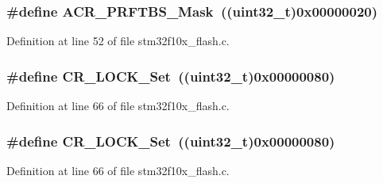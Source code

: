 \subsubsection[{\texorpdfstring{A\+C\+R\+\_\+\+P\+R\+F\+T\+B\+S\+\_\+\+Mask}{ACR_PRFTBS_Mask}}]{\setlength{\rightskip}{0pt plus 5cm}\#define A\+C\+R\+\_\+\+P\+R\+F\+T\+B\+S\+\_\+\+Mask~(({\bf uint32\+\_\+t})0x00000020)}\hypertarget{group___f_l_a_s_h___private___defines_ga257768fe5d61ac49f43b6b90ba413102}{}\label{group___f_l_a_s_h___private___defines_ga257768fe5d61ac49f43b6b90ba413102}


Definition at line 52 of file stm32f10x\+\_\+flash.\+c.

\subsubsection[{\texorpdfstring{C\+R\+\_\+\+L\+O\+C\+K\+\_\+\+Set}{CR_LOCK_Set}}]{\setlength{\rightskip}{0pt plus 5cm}\#define C\+R\+\_\+\+L\+O\+C\+K\+\_\+\+Set~(({\bf uint32\+\_\+t})0x00000080)}\hypertarget{group___f_l_a_s_h___private___defines_gaee27a8100366266daa8d3a69c589e4b9}{}\label{group___f_l_a_s_h___private___defines_gaee27a8100366266daa8d3a69c589e4b9}


Definition at line 66 of file stm32f10x\+\_\+flash.\+c.

\subsubsection[{\texorpdfstring{C\+R\+\_\+\+L\+O\+C\+K\+\_\+\+Set}{CR_LOCK_Set}}]{\setlength{\rightskip}{0pt plus 5cm}\#define C\+R\+\_\+\+L\+O\+C\+K\+\_\+\+Set~(({\bf uint32\+\_\+t})0x00000080)}\hypertarget{group___f_l_a_s_h___private___defines_gaee27a8100366266daa8d3a69c589e4b9}{}\label{group___f_l_a_s_h___private___defines_gaee27a8100366266daa8d3a69c589e4b9}


Definition at line 66 of file stm32f10x\+\_\+flash.\+c.

